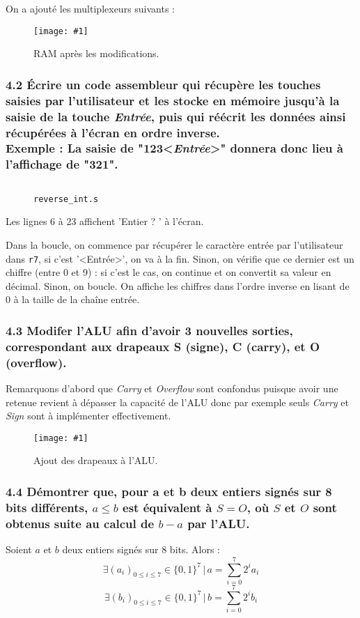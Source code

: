 \documentclass[twoside, 12pt, a4paper]{article}
\newcommand{\cf}[3]{
    \begin{figure}[!h]
        \centering
        \texttt{[image: \#1]}
    \caption{#3}\label{Fig:#1}
    \end{figure}
}
\newcommand{\hcf}[2]{\cf{#1}{.75}{#2}}
\newcommand{\qcf}[2]{\cf{#1}{.5}{#2}}
\newcommand{\fm}[2]{
\begin{figure}[!h]
    \centering
    \inputminted[]{asm}{#1}
    \caption{\texttt{#2}}
\end{figure}
}
\begin{document}
\clearpage

On a ajouté les multiplexeurs suivants :
\hcf{ram.png}{RAM après les modifications.}


\clearpage

        \subsubsection*{\textbf{4.2} Écrire un code assembleur qui récupère les touches saisies par l'utilisateur et les stocke en mémoire jusqu'à la saisie de la touche \textit{Entrée}, puis qui réécrit les données ainsi récupérées à l'écran en ordre inverse. \\
        \textbf{Exemple : } La saisie de "123<\textit{Entrée}>" donnera donc lieu à l'affichage de "321".}

\fm{../asm/q4_2/reverse_int.s}{reverse\_int.s}

Les lignes 6 à 23 affichent 'Entier ? ' à l'écran.

Dans la boucle, on commence par récupérer le caractère entrée par l'utilisateur dans \texttt{r7}, si c'est '<Entrée>', on va à la fin.
Sinon, on vérifie que ce dernier est un chiffre (entre 0 et 9) : si c'est le cas, on continue et on convertit sa valeur en décimal.
Sinon, on boucle.
On affiche les chiffres dans l'ordre inverse en lisant de 0 à la taille de la chaîne entrée.

\clearpage
      
        \subsubsection*{\textbf{4.3} Modifer l'ALU afin d'avoir 3 nouvelles sorties, correspondant aux drapeaux S (signe), C (carry), et O (overflow).}

Remarquons d'abord que \textit{Carry} et \textit{Overflow} sont confondus puisque avoir une retenue revient à dépasser la capacité de l'ALU donc par exemple seuls \textit{Carry} et \textit{Sign} sont à implémenter effectivement.

\qcf{ALU_flags.png}{Ajout des drapeaux à l'ALU.}

\clearpage
        
        \subsubsection*{\textbf{4.4} Démontrer que, pour a et b deux entiers signés sur 8 bits différents, $a \leq b$ est équivalent à $S = O$, où $S$ et $O$ sont obtenus suite au calcul de $b-a$ par l'ALU.}
        Soient $a$ et $b$ deux entiers signés sur 8 bits.
        Alors :
        $$
        \exists (a_i)_{0\leq i \leq 7} \in \{0, 1\}^7 \, | \, a = \sum_{i=0}^7 2^i a_i
        $$
        $$
        \exists (b_i)_{0\leq i \leq 7} \in \{0, 1\}^7 \, | \, b = \sum_{i=0}^7 2^i b_i
        $$
\end{document}
